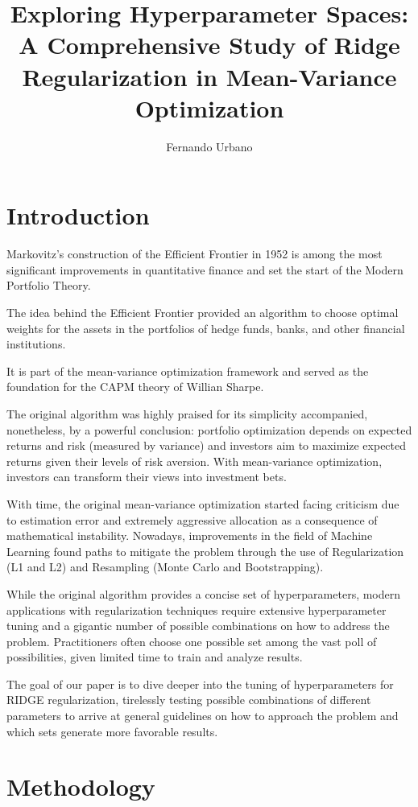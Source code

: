\documentclass{article}
\title{Exploring Hyperparameter Spaces: A Comprehensive Study of Ridge Regularization in Mean-Variance Optimization}
\author{Fernando Urbano}
\begin{document}
\maketitle

\section{Introduction}

Markovitz's construction of the Efficient Frontier in 1952 is among the most significant improvements in quantitative finance and set the start of the Modern Portfolio Theory.

The idea behind the Efficient Frontier provided an algorithm to choose optimal weights for the assets in the portfolios of hedge funds, banks, and other financial institutions.

It is part of the mean-variance optimization framework and served as the foundation for the CAPM theory of Willian Sharpe.

The original algorithm was highly praised for its simplicity accompanied, nonetheless, by a powerful conclusion: portfolio optimization depends on expected returns and risk (measured by variance) and investors aim to maximize expected returns given their levels of risk aversion. With mean-variance optimization, investors can transform their views into investment bets.

With time, the original mean-variance optimization started facing criticism due to estimation error and extremely aggressive allocation as a consequence of mathematical instability. Nowadays, improvements in the field of Machine Learning found paths to mitigate the problem through the use of Regularization (L1 and L2) and Resampling (Monte Carlo and Bootstrapping).

While the original algorithm provides a concise set of hyperparameters, modern applications with regularization techniques require extensive hyperparameter tuning and a gigantic number of possible combinations on how to address the problem. Practitioners often choose one possible set among the vast poll of possibilities, given limited time to train and analyze results.

The goal of our paper is to dive deeper into the tuning of hyperparameters for RIDGE regularization, tirelessly testing possible combinations of different parameters to arrive at general guidelines on how to approach the problem and which sets generate more favorable results.

\section{Methodology}
\end{document}
